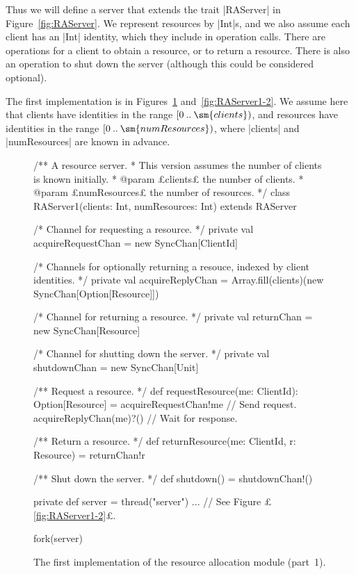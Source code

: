 
Thus we will define a server that extends the trait |RAServer| in
Figure~\ref{fig:RAServer}.  We represent resources by |Int|s, and we also
assume each client has an |Int| identity, which they include in operation
calls.  There are operations for a client to obtain a resource, or to return a
resource.  There is also an operation to shut down the server (although this
could be considered optional).


The first implementation is in Figures~\ref{fig:RAServer1-1}
and~\ref{fig:RAServer1-2}.  We assume here that clients have identities in the
range $\interval0{\sm{clients}}$, and resources have identities in the range
$\interval0{\sm{numResources}}$, where |clients| and |numResources| are known
in advance.


\begin{figure}
\begin{scala}
/** A resource server. 
  * This version assumes the number of clients is known initially. 
  * @param £clients£ the number of clients.
  * @param £numResources£ the number of resources.  */
class RAServer1(clients: Int, numResources: Int) extends RAServer{

  /* Channel for requesting a resource. */
  private val acquireRequestChan = new SyncChan[ClientId]

  /* Channels for optionally returning a resouce, indexed by client identities. */
  private val acquireReplyChan = 
    Array.fill(clients)(new SyncChan[Option[Resource]])

  /* Channel for returning a resource. */
  private val returnChan = new SyncChan[Resource]

  /* Channel for shutting down the server. */
  private val shutdownChan = new SyncChan[Unit]

  /** Request a resource. */
  def requestResource(me: ClientId): Option[Resource] = {
    acquireRequestChan!me  // Send request.
    acquireReplyChan(me)?() // Wait for response.
  }

  /** Return a resource. */
  def returnResource(me: ClientId, r: Resource) = returnChan!r

  /** Shut down the server. */
  def shutdown() = shutdownChan!()

  private def server = thread("server"){ ...  } // See Figure £\ref{fig:RAServer1-2}£.

  fork(server)
}
\end{scala}
\caption{The first implementation of the resource allocation module (part~1).}
\label{fig:RAServer1-1} 
\end{figure}

